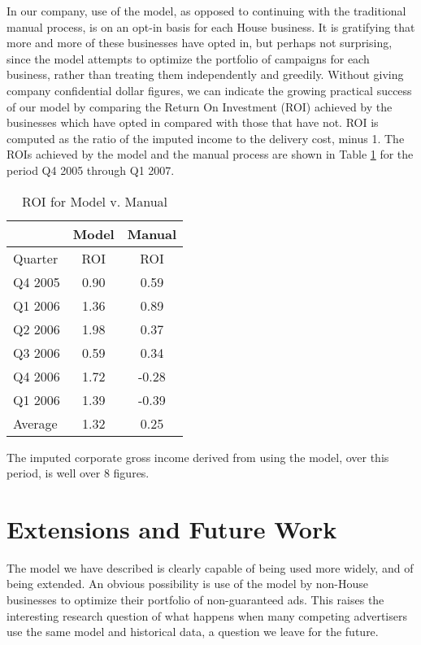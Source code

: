\documentclass[finalversion,simpleeqnnos]{yrl}
\begin{document}
In our company, use of the model, as opposed to continuing with the traditional manual process, is on an opt-in basis for each House business. It is gratifying that more and more of these businesses have opted in, but perhaps not surprising, since the model attempts to optimize the portfolio of campaigns for each business, rather than treating them independently and greedily.
Without giving company confidential dollar figures, we can indicate the growing practical success of our model by comparing the Return On Investment (ROI) achieved by the businesses which have opted in compared with those that have not. ROI is computed as the ratio of the imputed income to the delivery cost, minus 1. The ROIs achieved by the model and the manual process are shown in Table \ref{adopt} for the period Q4 2005 through Q1 2007.

\begin{table}[htbp]
\begin{centering}
\begin{tabular}{|| l | c | c ||}
\hline
 & Model  & Manual \\ \hline
Quarter & ROI & ROI \\ \hline
Q4 2005 & 0.90  &  0.59 \\ \hline
Q1 2006 & 1.36 & 0.89 \\ \hline 
Q2 2006 & 1.98 & 0.37 \\ \hline 
Q3 2006 & 0.59 & 0.34 \\ \hline 
Q4 2006 & 1.72 & -0.28 \\ \hline 
Q1 2006 & 1.39 & -0.39 \\ \hline
Average & 1.32 & 0.25 \\ \hline 
\end{tabular}
\caption{ROI for Model v. Manual}
\label{adopt}
\end{centering}
\end{table}

The imputed corporate gross income derived from using the model, over this period, is well over 8 figures.

\section{Extensions and Future Work}

The model we have described is clearly capable of being used more widely, and of being extended. An obvious possibility is use of the model by non-House businesses to optimize their portfolio of non-guaranteed ads. This raises the interesting research question of what happens when many competing advertisers use the same model and historical data, a question we leave for the future.
\end{document}
